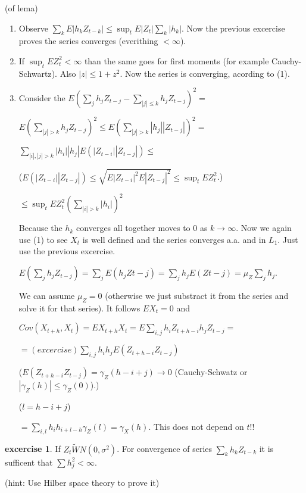 \documentclass[12pt,a4paper]{amsart}
\theoremstyle{definition} %
\newtheorem{excercise}[defn]{excercise}
\theoremstyle{plain} %
\begin{document}
\proof (of lema)
\begin{enumerate}
\item Observe $\sum_k E|h_k Z_{t-k}| \leq \sup_t E|Z_t|\sum_k |h_k|$. Now the previous excercise proves the series converges (everithing $< \infty$). 
\item If $\sup_t E Z_t^2 < \infty$ than the same goes for first moments (for example Cauchy-Schwartz). Also $|z| \leq 1 + z^2$. Now the series is converging, acording to (1). 
\item Consider the $E(\sum_j h_j Z_{t-j} - \sum_{|j|\leq k} h_j Z_{t-j})^2 =$

$ E(\sum_{|j| > k} h_j Z_{t-j})^2  \leq E(\sum_{|j| > k} |h_j| |Z_{t-j}|)^2 =$

$ \sum_{ |i|,|j| > k} |h_i||h_j| E(|Z_{t-i}||Z_{t-j}|)\leq$

($E(|Z_{t-i}||Z_{t-j}|) \leq \sqrt{E|Z_{t-i}|^2 E|Z_{t-j}|^2} \leq \sup_t E Z_t^2$.)

$\leq  \sup_t E Z_t^2 (\sum_{|i| > k} |h_i|)^2$

Because the $h_k$ converges all together moves to $0$ as $k \rightarrow \infty$. Now we again use (1) to see $X_t$ is well defined and the series converges a.a. and in $L_1$. Just use the previous excercise.

$E(\sum_j h_j Z_{t-j}) = \sum_j E(h_j Z{t-j}) = \sum_j h_j E(Z{t-j}) = \mu_Z \sum_j h_j$.

We can assume $\mu_Z = 0$ (otherwise we just substract it from the series and solve it for that series). It follows $EX_t = 0$ and 

$Cov(X_{t+h}, X_t) = E X_{t+h}X_t = E \sum_{i,j}h_i Z_{t+h-i}h_j Z_{t-j} = $

$= (excercise) \sum_{i,j} h_i h_j E(Z_{t+h-i} Z_{t-j})$

($E(Z_{t+h-i} Z_{t-j}) = \gamma_Z(h-i+j) \rightarrow 0$ (Cauchy-Schwatz or $|\gamma_Z(h)| \leq \gamma_Z(0)$).)

($l = h - i + j$)

$= \sum_{i,l}h_i h_{i+l-h} \gamma_Z(l) = \gamma_X(h)$. This does not depend on $t$!!  
\end{enumerate}
\endproof


\begin{excercise}
If $Z_t \tilde WN(0, \sigma^2 )$. For convergence of series $\sum_k h_k Z_{t-k}$ it is sufficent that $\sum h_j^2 < \infty$.

(hint: Use Hilber space theory to prove it)
\end{excercise}
\end{document}
